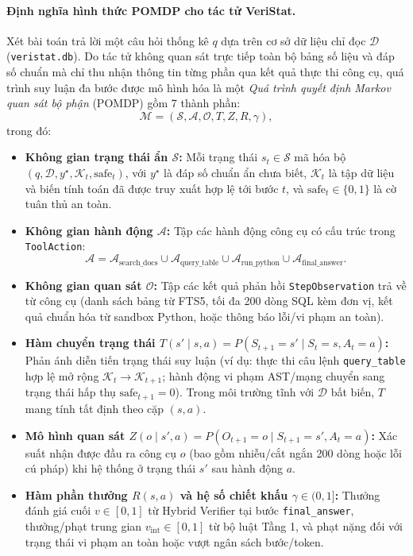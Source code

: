 \paragraph{Định nghĩa hình thức POMDP cho tác tử VeriStat.}
Xét bài toán trả lời một câu hỏi thống kê $q$ dựa trên cơ sở dữ liệu chỉ đọc $\mathcal{D}$ (\texttt{veristat.db}). Do tác tử không quan sát trực tiếp toàn bộ bảng số liệu và đáp số chuẩn mà chỉ thu nhận thông tin từng phần qua kết quả thực thi công cụ, quá trình suy luận đa bước được mô hình hóa là một \emph{Quá trình quyết định Markov quan sát bộ phận} (POMDP) gồm 7 thành phần:
\[
  \mathcal{M} = (\mathcal{S}, \mathcal{A}, \mathcal{O}, T, Z, R, \gamma),
\]
trong đó:
\begin{itemize}
  \item \textbf{Không gian trạng thái ẩn $\mathcal{S}$:} Mỗi trạng thái $s_t \in \mathcal{S}$ mã hóa bộ $(q, \mathcal{D}, y^\star, \mathcal{K}_t, \text{safe}_t)$, với $y^\star$ là đáp số chuẩn ẩn chưa biết, $\mathcal{K}_t$ là tập dữ liệu và biến tính toán đã được truy xuất hợp lệ tới bước $t$, và $\text{safe}_t \in \{0, 1\}$ là cờ tuân thủ an toàn.
  \item \textbf{Không gian hành động $\mathcal{A}$:} Tập các hành động công cụ có cấu trúc trong \texttt{ToolAction}:
  \[
    \mathcal{A} = \mathcal{A}_{\text{search\_docs}} \cup \mathcal{A}_{\text{query\_table}} \cup \mathcal{A}_{\text{run\_python}} \cup \mathcal{A}_{\text{final\_answer}}.
  \]
  \item \textbf{Không gian quan sát $\mathcal{O}$:} Tập các kết quả phản hồi \texttt{StepObservation} trả về từ công cụ (danh sách bảng từ FTS5, tối đa 200 dòng SQL kèm đơn vị, kết quả chuẩn hóa từ sandbox Python, hoặc thông báo lỗi/vi phạm an toàn).
  \item \textbf{Hàm chuyển trạng thái $T(s' \mid s, a) = P(S_{t+1} = s' \mid S_t = s, A_t = a)$:} Phản ánh diễn tiến trạng thái suy luận (ví dụ: thực thi câu lệnh \texttt{query\_table} hợp lệ mở rộng $\mathcal{K}_t \to \mathcal{K}_{t+1}$; hành động vi phạm AST/mạng chuyển sang trạng thái hấp thụ $\text{safe}_{t+1} = 0$). Trong môi trường tĩnh với $\mathcal{D}$ bất biến, $T$ mang tính tất định theo cặp $(s, a)$.
  \item \textbf{Mô hình quan sát $Z(o \mid s', a) = P(O_{t+1} = o \mid S_{t+1} = s', A_t = a)$:} Xác suất nhận được đầu ra công cụ $o$ (bao gồm nhiễu/cắt ngắn 200 dòng hoặc lỗi cú pháp) khi hệ thống ở trạng thái $s'$ sau hành động $a$.
  \item \textbf{Hàm phần thưởng $R(s, a)$ và hệ số chiết khấu $\gamma \in (0, 1]$:} Thưởng đánh giá cuối $v \in [0, 1]$ từ Hybrid Verifier tại bước \texttt{final\_answer}, thưởng/phạt trung gian $v_{\text{int}} \in [0, 1]$ từ bộ luật Tầng 1, và phạt nặng đối với trạng thái vi phạm an toàn hoặc vượt ngân sách bước/token.
\end{itemize}

